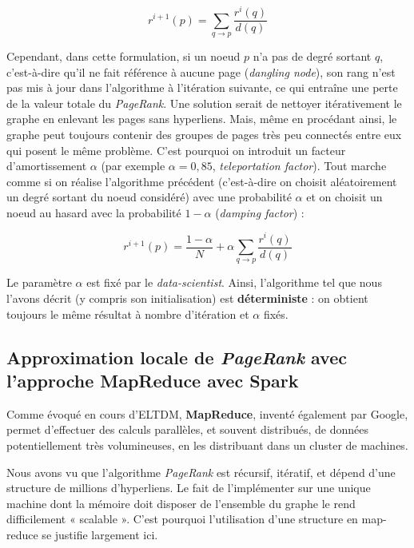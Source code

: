 \documentclass[10pt,a4paper]{article}
\theoremstyle{break}
\begin{document}
\begin{equation} \label{eq:eq2}
r^{i+1}(p)=\sum_{ q \rightarrow p}\frac{r^{i}(q)}{d(q)}
\end{equation}

Cependant, dans cette formulation, si un noeud \(p\) n'a pas de degré sortant \(q\), c'est-à-dire qu'il ne fait référence à aucune page (\emph{dangling node}), son rang n'est pas mis à jour dans l'algorithme à l'itération suivante, ce qui entraîne une perte de la valeur totale du \emph{PageRank}. Une solution serait de nettoyer itérativement le graphe en enlevant les pages sans hyperliens. Mais, même en procédant ainsi, le graphe peut toujours contenir des groupes de pages très peu connectés entre eux qui posent le même problème. C'est pourquoi on introduit un facteur d'amortissement \(\alpha\) (par exemple \(\alpha = 0,85\), \emph{teleportation factor}). Tout marche comme si on réalise l'algorithme précédent (c'est-à-dire on choisit aléatoirement un degré sortant du noeud considéré) avec une probabilité \(\alpha\) et on choisit un noeud au hasard avec la probabilité \(1-\alpha\) (\emph{damping factor}) :

\begin{equation} \label{eq:eq3}
r^{i+1}(p)=\frac{1-\alpha}{N}+\alpha \sum_{ q \rightarrow p}\frac{r^{i}(q)}{d(q)}
\end{equation}

Le paramètre \(\alpha\) est fixé par le \emph{data-scientist}. Ainsi, l'algorithme tel que nous l'avons décrit (y compris son initialisation) est \textbf{déterministe} : on obtient toujours le même résultat à nombre d'itération et \(\alpha\) fixés.

\hypertarget{approximation-locale-de-pagerank-avec-lapproche-mapreduce-avec-spark}{%
\subsection{\texorpdfstring{Approximation locale de \emph{PageRank} avec l'approche MapReduce avec Spark}{Approximation locale de PageRank avec l'approche MapReduce avec Spark}}\label{approximation-locale-de-pagerank-avec-lapproche-mapreduce-avec-spark}}

Comme évoqué en cours d'ELTDM, \textbf{MapReduce}, inventé également par Google, permet d'effectuer des calculs parallèles, et souvent distribués, de données potentiellement très volumineuses, en les distribuant dans un cluster de machines.

Nous avons vu que l'algorithme \emph{PageRank} est récursif, itératif, et dépend d'une structure de millions d'hyperliens. Le fait de l'implémenter sur une unique machine dont la mémoire doit disposer de l'ensemble du graphe le rend difficilement « scalable ». C'est pourquoi l'utilisation d'une structure en map-reduce se justifie largement ici.
\end{document}
